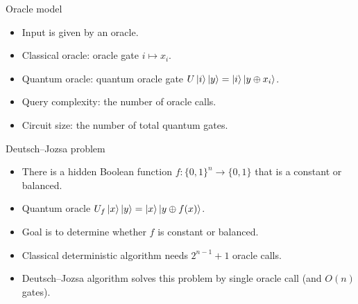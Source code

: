 \documentclass{beamer}
\newcommand\emm[1]{\textcolor{redorange}{{#1}}}
\begin{document}
\begin{frame}{Oracle model}

\begin{itemize}
\setlength{\itemsep}{2em}
\item Input is given by an oracle.
\item Classical oracle: oracle gate $i\mapsto x_i$.
\item Quantum oracle: quantum oracle gate $U\ket{i}\ket{y} = \ket{i}\ket{y\oplus x_i}$.
\item Query complexity: the number of oracle calls.
\item Circuit size: the number of total quantum gates.
\end{itemize}
\end{frame}

\begin{frame}{Deutsch--Jozsa problem}
\begin{itemize}
\setlength{\itemsep}{2em}
\item There is a hidden Boolean function $f\colon\{0,1\}^n\to\{0,1\}$ that is a \emm{constant or balanced}.
\item Quantum oracle $U_f\ket{x}\ket{y} = \ket{x}\ket{y\oplus f(x)}$.
\item Goal is to determine whether $f$ is constant or balanced.
\item Classical deterministic algorithm needs $2^{n-1}+1$ oracle calls.
\item Deutsch--Jozsa algorithm solves this problem by \emm{single} oracle call (and $O(n)$ gates).
\end{itemize}
\end{frame}
\end{document}
